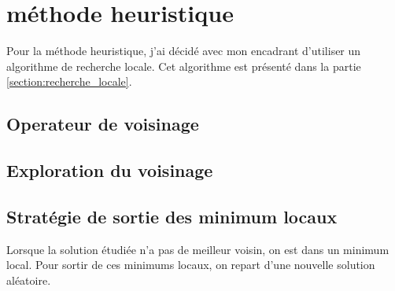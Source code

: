 \section{méthode heuristique}

Pour la méthode heuristique, j'ai décidé avec mon encadrant d'utiliser un algorithme de recherche locale.
Cet algorithme est présenté dans la partie \autoref{section:recherche_locale}.
	

\subsection{Operateur de voisinage}



\subsection{Exploration du voisinage}
\subsection{Stratégie de sortie des minimum locaux}
Lorsque la solution étudiée n'a pas de meilleur voisin, on est dans un minimum local.
Pour sortir de ces minimums locaux, on repart d'une nouvelle solution aléatoire.
